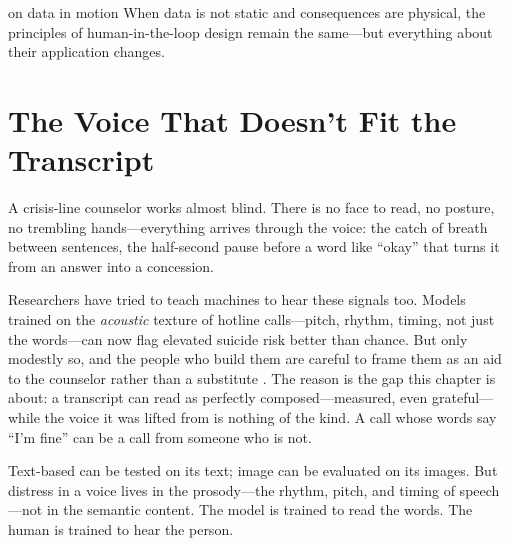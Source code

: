 
\label{chap:ch16}
\begin{chapterquote}{on data in motion}
When data is not static and consequences are physical, the principles of human-in-the-loop design remain the same---but everything about their application changes.
\end{chapterquote}

\section{The Voice That Doesn't Fit the Transcript}
\label{sec:voice-transcript}

A crisis-line counselor works almost blind. There is no face to read, no posture, no trembling hands---everything arrives through the voice: the catch of breath between sentences, the half-second pause before a word like ``okay'' that turns it from an answer into a concession.

Researchers have tried to teach machines to hear these signals too. Models trained on the \emph{acoustic} texture of hotline calls---pitch, rhythm, timing, not just the words---can now flag elevated suicide risk better than chance. But only modestly so, and the people who build them are careful to frame them as an aid to the counselor rather than a substitute \autocite{su2025acoustic}. The reason is the gap this chapter is about: a transcript can read as perfectly composed---measured, even grateful---while the voice it was lifted from is nothing of the kind. A call whose words say ``I'm fine'' can be a call from someone who is not.

Text-based \ai can be tested on its text; image \ai can be evaluated on its images. But distress in a voice lives in the prosody---the rhythm, pitch, and timing of speech---not in the semantic content. The model is trained to read the words. The human is trained to hear the person.

